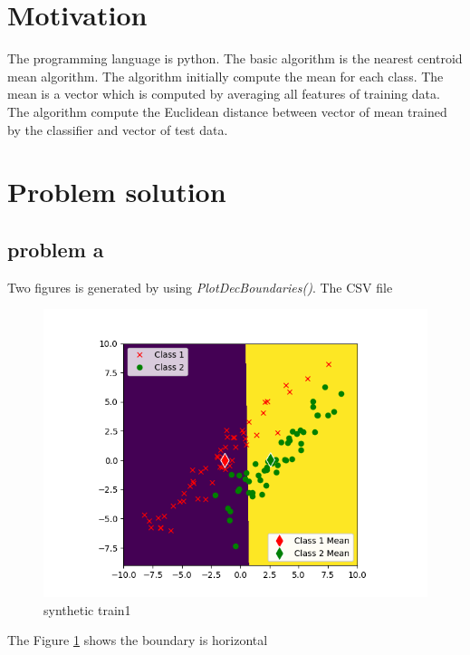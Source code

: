 \documentclass{article}
\begin{document}
	\section{Motivation}
	The programming language is python. The basic algorithm is the nearest centroid mean algorithm. The algorithm initially compute the mean for each class. The mean is a vector which is computed by averaging all features of training data. The algorithm compute the Euclidean distance between vector of mean trained by the classifier and vector of test data. 
	
	
	
	\section{Problem solution}
	\subsection{problem a}
	Two figures is generated by using \textit{PlotDecBoundaries()}. The CSV file 
	\begin{figure}[hbt!]
		\includegraphics[width=\linewidth]{images/synthetic_trian1.png}	
		\caption{synthetic train1}
		\label{fig:synthetictrain1}
	\end{figure}
The Figure \ref{fig:synthetictrain1} shows the boundary is horizontal 
\end{document}
